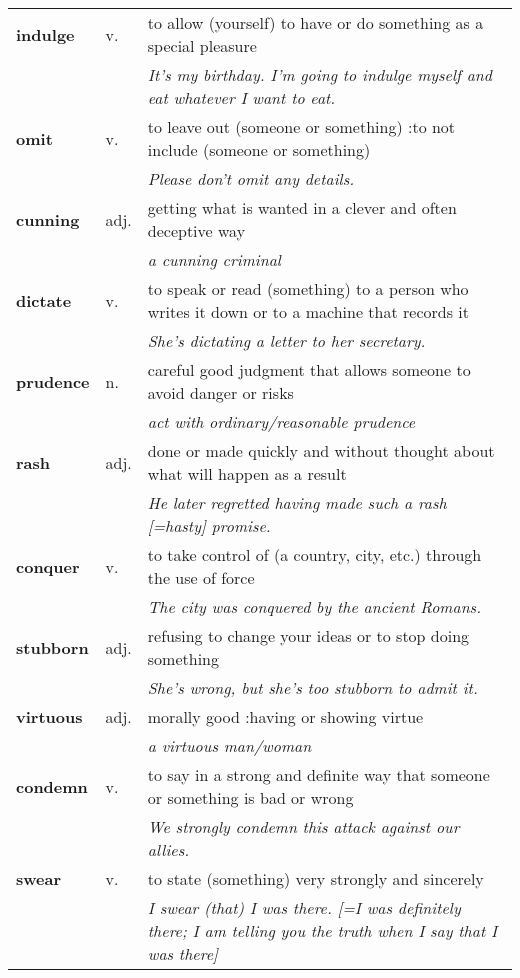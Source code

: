 \documentclass[a4paper]{article}
\begin{document}
\begin{longtable}{llp{11cm}}
\textbf{indulge} & v. &  to allow (yourself) to have or do something as a special pleasure \\
 & & \textit{It's my birthday. I'm going to indulge myself and eat whatever I want to eat.}\\[0.08cm]
\textbf{omit} & v. &  to leave out (someone or something) :to not include (someone or something) \\
 & & \textit{Please don't omit any details.}\\[0.08cm]
\textbf{cunning} & adj. &  getting what is wanted in a clever and often deceptive way \\
 & & \textit{a cunning criminal}\\[0.08cm]
\textbf{dictate} & v. &  to speak or read (something) to a person who writes it down or to a machine that records it \\
 & & \textit{She's dictating a letter to her secretary.}\\[0.08cm]
\textbf{prudence} & n. &  careful good judgment that allows someone to avoid danger or risks \\
 & & \textit{act with ordinary/reasonable prudence}\\[0.08cm]
\textbf{rash} & adj. &  done or made quickly and without thought about what will happen as a result \\
 & & \textit{He later regretted having made such a rash [=hasty] promise.}\\[0.08cm]
\textbf{conquer} & v. &  to take control of (a country, city, etc.) through the use of force \\
 & & \textit{The city was conquered by the ancient Romans.}\\[0.08cm]
\textbf{stubborn} & adj. &  refusing to change your ideas or to stop doing something \\
 & & \textit{She's wrong, but she's too stubborn to admit it.}\\[0.08cm]
\textbf{virtuous} & adj. &  morally good :having or showing virtue \\
 & & \textit{a virtuous man/woman}\\[0.08cm]
\textbf{condemn} & v. &  to say in a strong and definite way that someone or something is bad or wrong \\
 & & \textit{We strongly condemn this attack against our allies.}\\[0.08cm]
\textbf{swear} & v. &  to state (something) very strongly and sincerely \\
 & & \textit{I swear (that) I was there. [=I was definitely there; I am telling you the truth when I say that I was there]}\\[0.08cm]

\end{longtable}
\end{document}
